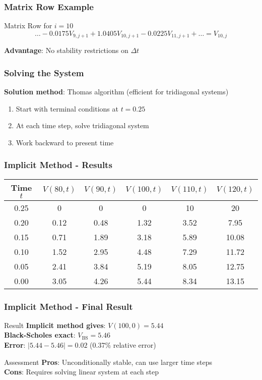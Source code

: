 \documentclass[aspectratio=169]{beamer}
\begin{document}
\begin{frame}
\frametitle{Matrix Row Example}
\begin{block}{Matrix Row for \(i = 10\)}
\[\ldots - 0.0175 V_{9,j+1} + 1.0405 V_{10,j+1} - 0.0225 V_{11,j+1} + \ldots = V_{10,j}\]
\end{block}

\textbf{Advantage}: No stability restrictions on \(\Delta t\)
\end{frame}

\begin{frame}
\frametitle{Solving the System}
\textbf{Solution method}: Thomas algorithm (efficient for tridiagonal systems)

\begin{enumerate}
\item Start with terminal conditions at \(t = 0.25\)
\item At each time step, solve tridiagonal system
\item Work backward to present time
\end{enumerate}
\end{frame}

\begin{frame}
\frametitle{Implicit Method - Results}
\begin{center}
\begin{tabular}{c|c|c|c|c|c}
Time \(t\) & \(V(80,t)\) & \(V(90,t)\) & \(V(100,t)\) & \(V(110,t)\) & \(V(120,t)\) \\
\hline
0.25 & 0 & 0 & 0 & 10 & 20 \\
0.20 & 0.12 & 0.48 & 1.32 & 3.52 & 7.95 \\
0.15 & 0.71 & 1.89 & 3.18 & 5.89 & 10.08 \\
0.10 & 1.52 & 2.95 & 4.48 & 7.29 & 11.72 \\
0.05 & 2.41 & 3.84 & 5.19 & 8.05 & 12.75 \\
0.00 & 3.05 & 4.26 & 5.44 & 8.34 & 13.15 \\
\end{tabular}
\end{center}
\end{frame}

\begin{frame}
\frametitle{Implicit Method - Final Result}
\begin{block}{Result}
\textbf{Implicit method gives}: \(V(100, 0) = 5.44\)\\
\textbf{Black-Scholes exact}: \(V_{\text{BS}} = 5.46\)\\
\textbf{Error}: \(|5.44 - 5.46| = 0.02\) (0.37\% relative error)
\end{block}

\begin{block}{Assessment}
\textbf{Pros}: Unconditionally stable, can use larger time steps\\
\textbf{Cons}: Requires solving linear system at each step
\end{block}
\end{frame}
\end{document}
